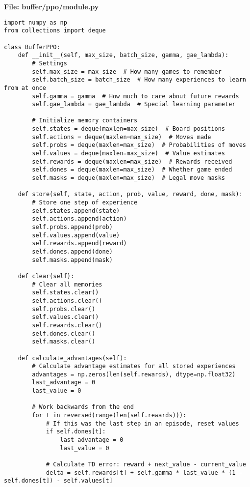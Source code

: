 \documentclass[11pt]{article}
\begin{document}
\begin{tcolorbox}[colback=brown!5!white,colframe=brown!75!black,title=Building the Memory System]
\textbf{File: buffer/ppo/module.py}
\begin{lstlisting}[style=Python]
import numpy as np
from collections import deque

class BufferPPO:
    def __init__(self, max_size, batch_size, gamma, gae_lambda):
        # Settings
        self.max_size = max_size  # How many games to remember
        self.batch_size = batch_size  # How many experiences to learn from at once
        self.gamma = gamma  # How much to care about future rewards
        self.gae_lambda = gae_lambda  # Special learning parameter
        
        # Initialize memory containers
        self.states = deque(maxlen=max_size)  # Board positions
        self.actions = deque(maxlen=max_size)  # Moves made
        self.probs = deque(maxlen=max_size)  # Probabilities of moves
        self.values = deque(maxlen=max_size)  # Value estimates
        self.rewards = deque(maxlen=max_size)  # Rewards received
        self.dones = deque(maxlen=max_size)  # Whether game ended
        self.masks = deque(maxlen=max_size)  # Legal move masks
    
    def store(self, state, action, prob, value, reward, done, mask):
        # Store one step of experience
        self.states.append(state)
        self.actions.append(action)
        self.probs.append(prob)
        self.values.append(value)
        self.rewards.append(reward)
        self.dones.append(done)
        self.masks.append(mask)
    
    def clear(self):
        # Clear all memories
        self.states.clear()
        self.actions.clear()
        self.probs.clear()
        self.values.clear()
        self.rewards.clear()
        self.dones.clear()
        self.masks.clear()
    
    def calculate_advantages(self):
        # Calculate advantage estimates for all stored experiences
        advantages = np.zeros(len(self.rewards), dtype=np.float32)
        last_advantage = 0
        last_value = 0
        
        # Work backwards from the end
        for t in reversed(range(len(self.rewards))):
            # If this was the last step in an episode, reset values
            if self.dones[t]:
                last_advantage = 0
                last_value = 0
            
            # Calculate TD error: reward + next_value - current_value
            delta = self.rewards[t] + self.gamma * last_value * (1 - self.dones[t]) - self.values[t]
            

\end{lstlisting}
\end{tcolorbox}
\end{document}
